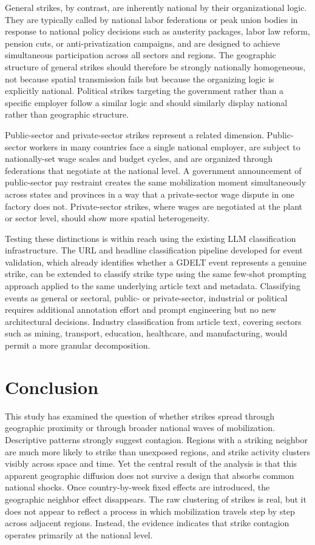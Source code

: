 \documentclass[
  11pt,
]{article}
\begin{document}
General strikes, by contrast, are inherently national by their
organizational logic. They are typically called by national labor
federations or peak union bodies in response to national policy
decisions such as austerity packages, labor law reform, pension cuts, or
anti-privatization campaigns, and are designed to achieve simultaneous
participation across all sectors and regions. The geographic structure
of general strikes should therefore be strongly nationally homogeneous,
not because spatial transmission fails but because the organizing logic
is explicitly national. Political strikes targeting the government
rather than a specific employer follow a similar logic and should
similarly display national rather than geographic structure.

Public-sector and private-sector strikes represent a related dimension.
Public-sector workers in many countries face a single national employer,
are subject to nationally-set wage scales and budget cycles, and are
organized through federations that negotiate at the national level. A
government announcement of public-sector pay restraint creates the same
mobilization moment simultaneously across states and provinces in a way
that a private-sector wage dispute in one factory does not.
Private-sector strikes, where wages are negotiated at the plant or
sector level, should show more spatial heterogeneity.

Testing these distinctions is within reach using the existing LLM
classification infrastructure. The URL and headline classification
pipeline developed for event validation, which already identifies
whether a GDELT event represents a genuine strike, can be extended to
classify strike type using the same few-shot prompting approach applied
to the same underlying article text and metadata. Classifying events as
general or sectoral, public- or private-sector, industrial or political
requires additional annotation effort and prompt engineering but no new
architectural decisions. Industry classification from article text,
covering sectors such as mining, transport, education, healthcare, and
manufacturing, would permit a more granular decomposition.

\section{Conclusion}\label{conclusion}

This study has examined the question of whether strikes spread through
geographic proximity or through broader national waves of mobilization.
Descriptive patterns strongly suggest contagion. Regions with a striking
neighbor are much more likely to strike than unexposed regions, and
strike activity clusters visibly across space and time. Yet the central
result of the analysis is that this apparent geographic diffusion does
not survive a design that absorbs common national shocks. Once
country-by-week fixed effects are introduced, the geographic neighbor
effect disappears. The raw clustering of strikes is real, but it does
not appear to reflect a process in which mobilization travels step by
step across adjacent regions. Instead, the evidence indicates that
strike contagion operates primarily at the national level.
\end{document}
